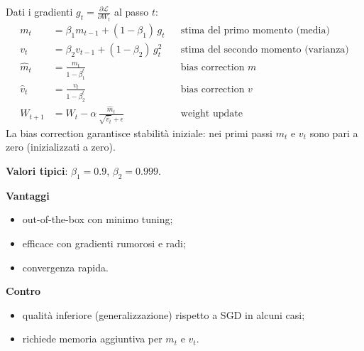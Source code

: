 \documentclass[11pt,a4paper]{article}
\begin{document}
Dati i gradienti $g_t = \frac{\partial\mathcal{L}}{\partial W_t}$ al passo $t$:
\begin{align*}
m_t &= \beta_1 m_{t-1} + (1-\beta_1)\, g_t && \text{stima del primo momento (media)}\\
v_t &= \beta_2 v_{t-1} + (1-\beta_2)\, g_t^2 && \text{stima del secondo momento (varianza)}\\
\hat{m}_t &= \frac{m_t}{1-\beta_1^t} && \text{bias correction } m\\
\hat{v}_t &= \frac{v_t}{1-\beta_2^t} && \text{bias correction } v\\
W_{t+1} &= W_t - \alpha\,\frac{\hat{m}_t}{\sqrt{\hat{v}_t}+\epsilon} && \text{weight update}
\end{align*}
La bias correction garantisce stabilità iniziale: nei primi passi $m_t$ e $v_t$ sono pari a zero (inizializzati a zero).

\textbf{Valori tipici}: $\beta_1 = 0.9$, $\beta_2 = 0.999$.


\begin{center}
\end{center}

\begin{minipage}[t]{0.48\textwidth}
\textbf{Vantaggi}
\begin{itemize}
  \item out-of-the-box con minimo tuning;
  \item efficace con gradienti rumorosi e radi;
  \item convergenza rapida.
\end{itemize}
\end{minipage}
\hfill
\begin{minipage}[t]{0.48\textwidth}
\textbf{Contro}
\begin{itemize}
  \item qualità inferiore (generalizzazione) rispetto a SGD in alcuni casi;
  \item richiede memoria aggiuntiva per $m_t$ e $v_t$.
\end{itemize}
\end{minipage}
\end{document}

